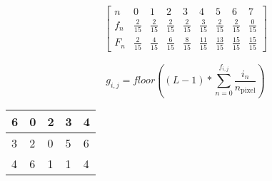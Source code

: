 \begin{align*}
    \begin{bmatrix}
        n   & 0             & 1             & 2             & 3             & 4             & 5             & 6             & 7 \\ \hline
        f_n &\frac{2}{15} &\frac{2}{15} &\frac{2}{15} &\frac{2}{15} &\frac{3}{15} &\frac{2}{15} &\frac{2}{15} &\frac{0}{15} \\
        F_n &\frac{2}{15} &\frac{4}{15} &\frac{6}{15} &\frac{8}{15} &\frac{11}{15} &\frac{13}{15} &\frac{15}{15} &\frac{15}{15}
    \end{bmatrix}
\end{align*}

\begin{equation}
    \label{eq:equalizer}
    g_{i,j} = floor((L - 1) * \sum_{n = 0}^{f_{i,j}} \frac{i_n}{n_{\text{pixel}}} )
\end{equation}

\begin{table}[]
    \label{tab:equalized_image}
    \begin{tabular}{|l|l|l|l|l|}
        \hline
        6 & 0 & 2 & 3 & 4 \\ \hline
        3 & 2 & 0 & 5 & 6 \\ \hline
        4 & 6 & 1 & 1 & 4 \\ \hline
    \end{tabular}
\end{table}
